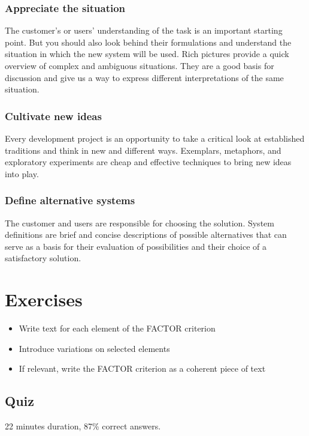 \subsubsection{Appreciate the situation}
The customer's or users' understanding of the task is an important starting point. But you should also look behind their formulations and understand the situation in which the new system will be used. Rich pictures provide a quick overview of complex and ambiguous situations. They are a good basis for discussion and give us a way to express different interpretations of the same situation. 

\subsubsection{Cultivate new ideas}
Every development project is an opportunity to take a critical look at established traditions and think in new and different ways. Exemplars, metaphors, and exploratory experiments are cheap and effective techniques to bring new ideas into play.

\subsubsection{Define alternative systems}
The customer and users are responsible for choosing the solution. System definitions are brief and concise descriptions of possible alternatives that can serve as a basis for their evaluation of possibilities and their choice of a satisfactory solution.

\section{Exercises}
\begin{itemize}
    \item Write text for each element of the FACTOR criterion
    \item Introduce variations on selected elements
    \item If relevant, write the FACTOR criterion as a coherent piece of text
\end{itemize}
\subsection{Quiz}
22 minutes duration, 87\% correct answers.